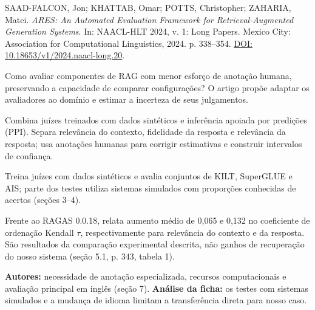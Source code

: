 {\small SAAD-FALCON, Jon; KHATTAB, Omar; POTTS, Christopher; ZAHARIA, Matei.
\textit{ARES: An Automated Evaluation Framework for Retrieval-Augmented Generation Systems}.
In: NAACL-HLT 2024, v. 1: Long Papers. Mexico City: Association for Computational Linguistics, 2024. p. 338--354.
\href{https://doi.org/10.18653/v1/2024.naacl-long.20}{DOI: 10.18653/v1/2024.naacl-long.20}.\par}

Como avaliar componentes de RAG com menor esforço de anotação humana, preservando a capacidade de comparar configurações? O artigo propõe adaptar os avaliadores ao domínio e estimar a incerteza de seus julgamentos.

Combina juízes treinados com dados sintéticos e inferência apoiada por predições (PPI). Separa relevância do contexto, fidelidade da resposta e relevância da resposta; usa anotações humanas para corrigir estimativas e construir intervalos de confiança.

Treina juízes com dados sintéticos e avalia conjuntos de KILT, SuperGLUE e AIS; parte dos testes utiliza sistemas simulados com proporções conhecidas de acertos (seções 3--4).

Frente ao RAGAS 0.0.18, relata aumento médio de 0,065 e 0,132 no coeficiente de ordenação Kendall $\tau$, respectivamente para relevância do contexto e da resposta. São resultados da comparação experimental descrita, não ganhos de recuperação do nosso sistema (seção 5.1, p. 343, tabela 1).

\begin{itemize}
\end{itemize}

\textbf{Autores:} necessidade de anotação especializada, recursos computacionais e avaliação principal em inglês (seção 7).
\textbf{Análise da ficha:} os testes com sistemas simulados e a mudança de idioma limitam a transferência direta para nosso caso.

